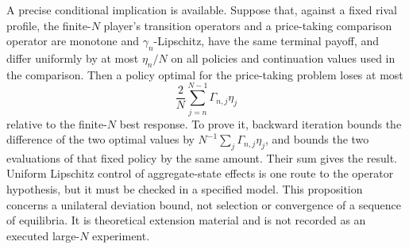 A precise conditional implication is available. Suppose that, against a fixed rival profile, the finite-$N$ player's transition operators and a price-taking comparison operator are monotone and $\gamma_n$-Lipschitz, have the same terminal payoff, and differ uniformly by at most $\eta_n/N$ on all policies and continuation values used in the comparison. Then a policy optimal for the price-taking problem loses at most
\[
 \frac2N\sum_{j=n}^{N-1}\Gamma_{n,j}\eta_j
\]
relative to the finite-$N$ best response. To prove it, backward iteration bounds the difference of the two optimal values by $N^{-1}\sum_j\Gamma_{n,j}\eta_j$, and bounds the two evaluations of that fixed policy by the same amount. Their sum gives the result. Uniform Lipschitz control of aggregate-state effects is one route to the operator hypothesis, but it must be checked in a specified model. This proposition concerns a unilateral deviation bound, not selection or convergence of a sequence of equilibria. It is theoretical extension material and is not recorded as an executed large-$N$ experiment.
